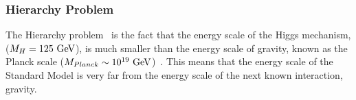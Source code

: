 
\subsubsection{Hierarchy Problem}

The Hierarchy problem~\cite{theo-hierarchy} is the fact that the energy scale of the Higgs mechanism, ($M_{H}\nobreak=\nobreak125~\text{GeV}$),
is much smaller than the energy scale of gravity,
known as the Planck scale ($M_{Planck}\nobreak\sim\nobreak10^{19}~\text{GeV}$)~\cite{obj-bjets_PDG}.
This means that the energy scale of the Standard Model is very far
from the energy scale of the next known interaction, gravity.

